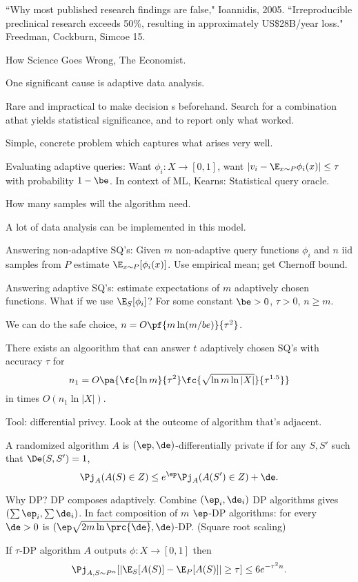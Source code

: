 ``Why most published research findings are false," Ioannidis, 2005. ``Irreproducible preclinical research exceeds 50\%, resulting in approximately US\$28B/year loss." Freedman, Cockburn, Simcoe 15. 

How Science Goes Wrong, The Economist.

One significant cause is adaptive data analysis. 

Rare and impractical to make decision s beforehand. Search for a combination athat yields statistical significance, and to report only what worked.

Simple, concrete problem which captures what arises very well. 

Evaluating adaptive queries: 
Want $\phi_i:X\to [0,1]$, want $|v_i-\E_{x\sim P} \phi_i(x)|\le \tau$ with probability $1-\be$. 
In context of ML, Kearns: Statistical query oracle.

How many samples will the algorithm need. 

A lot of data analysis can be implemented in this model.

Answering non-adaptive SQ's: Given $m$ non-adaptive query functions $\phi_i$ and $n$ iid samples from $P$ estimate $\E_{x\sim P}[\phi_i(x)]$. Use empirical mean; get Chernoff bound.

Answering adaptive SQ's: estimate expectations of $m$ adaptively chosen functions. What if we use $\E_S[\phi_i]$? For some constant $\be>0$, $\tau >0$, $n\ge m$.

We can do the safe choice, $n=O\pf{m\ln (m/be)}{\tau^2}$. 

There exists an algoorithm that can answer $t$ adaptively chosen SQ's with accuracy $\tau$ for 
\[
n_1 = O\pa{
\fc{\ln m}{\tau^2}\fc{\sqrt{\ln m\ln |X|}}{\tau^{1.5}}
}
\]
in times $O(n_1\ln|X|)$.

Tool: differential privcy.
Look at the outcome of algorithm that's adjacent. 

A randomized algorithm $A$ is $(\ep,\de)$-differentially private if for any $S,S'$ such that $\De(S,S')=1$, 
\[
\Pj_A(A(S)\in Z)\le e^\ep \Pj_A(A(S')\in Z)+\de.
\]

Why DP? DP composes adaptively. Combine $(\ep_i,\de_i)$ DP algorithms gives $(\sum\ep_i, \sum\de_i)$. In fact composition of $m$ $\ep$-DP algorithms: for every $\de>0$ is $(\ep\sqrt{2m\ln\prc{\de}},\de)$-DP.  (Square root scaling)

If $\tau$-DP algorithm $A$ outputs $\phi:X\to [0,1]$ then
\[
\Pj_{A,S\sim P^n}[|\E_S[A(S)]-\E_P[A(S)]|\ge \tau]\le 6e^{-\tau^2n}.
\]

